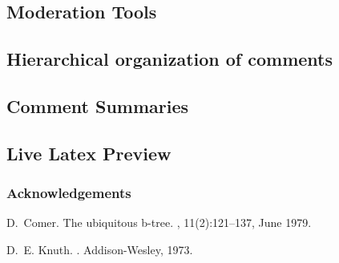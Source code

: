 \documentclass[a4paper]{article}
\begin{document}
\subsection{Moderation Tools}

\subsection{Hierarchical organization of comments}

\subsection{Comment Summaries}

\subsection{Live Latex Preview}

\subsubsection*{Acknowledgements}


% 
%

\begin{thebibliography}{Com79}

D.~Comer.
\newblock The ubiquitous b-tree.
, 11(2):121--137, June 1979.

D.~E. Knuth.
.
\newblock Addison-Wesley, 1973.

\end{thebibliography}
\end{document}
